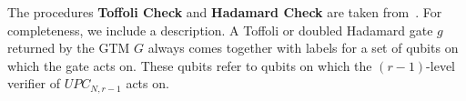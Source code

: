 The procedures  \textbf{Toffoli Check} and \textbf{Hadamard Check} are taken from~\cite{ji2016compression}. For completeness, we include a description. A Toffoli or doubled Hadamard gate $g$ returned by the GTM $G$ always comes together with labels for a set of qubits on which the gate acts on. These qubits refer to qubits on which the $(r-1)$-level verifier of $UPC_{N,r-1}$ acts on. 



